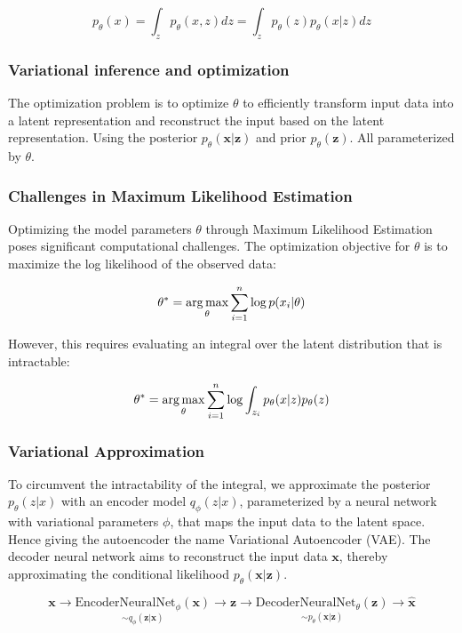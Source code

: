 \begin{equation}
    p_\theta(x) = \int_zp_\theta(x, z) dz= \int_z p_\theta(z)p_\theta(x|z)dz    
\end{equation}
\subsubsection{Variational inference and optimization}
The optimization problem is to optimize $\theta$ to efficiently transform input data into a latent representation and reconstruct the input based on the latent representation.
Using the posterior $p_\theta(\mathbf{x}|\mathbf{z})$ and prior $p_\theta(\mathbf{z})$. All parameterized by $\theta$.
\subsubsection{Challenges in Maximum Likelihood Estimation}
Optimizing the model parameters \( \theta \) through Maximum Likelihood Estimation poses significant computational challenges. The optimization objective for \( \theta \) is to maximize the log likelihood of the observed data:

\begin{equation}
    \theta^* = \operatorname*{arg\,max}_\theta \sum_{i=1}^n \log p(x_i | \theta)
\end{equation}

However, this requires evaluating an integral over the latent distribution that is intractable:

\begin{equation}
    \theta^* = \operatorname*{arg\,max}_\theta \sum_{i=1}^n \log\int_{z_i}p_\theta(x|z)p_\theta(z)
\end{equation}

\subsubsection{Variational Approximation}
To circumvent the intractability of the integral, we approximate the posterior \( p_\theta(z|x) \) with an encoder model \( q_\phi(z|x) \), parameterized by a neural network with variational parameters $\phi$, that maps the input data to the latent space.
Hence giving the autoencoder the name Variational Autoencoder (VAE). The decoder neural network aims to reconstruct the input data $\mathbf{x}$, thereby approximating the conditional likelihood $p_\theta(\mathbf{x}|\mathbf{z})$.

\begin{equation}
    \mathbf{x}\rightarrow \underset{\sim q_\phi(\mathbf{z}|\mathbf{x})}{\text{EncoderNeuralNet}_\phi(\mathbf{x})} \rightarrow \mathbf{z} \rightarrow \underset{\sim p_\theta(\mathbf{x}|\mathbf{z})}{\text{DecoderNeuralNet}_\theta(\mathbf{z})} \rightarrow \hat{\mathbf{x}}
\end{equation}

